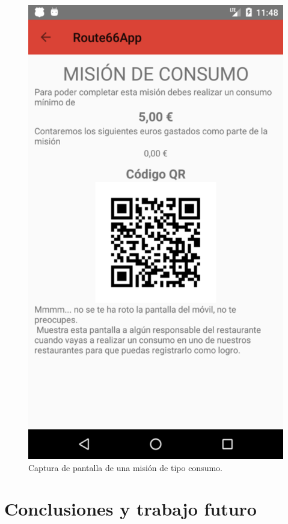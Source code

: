 \documentclass[twoside]{report}
\begin{document}
\begin{figure}[H]
\begin{center}
\includegraphics[scale=0.2]{images/userguide/31.png}
\caption{Captura de pantalla de una misión de tipo consumo.}
\end{center}
\end{figure}



\chapter{Conclusiones y trabajo futuro}
\end{document}
